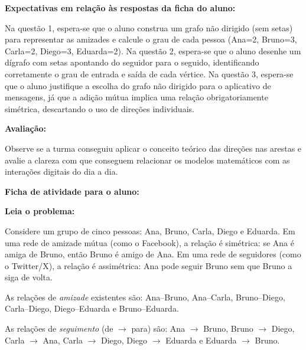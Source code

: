 \documentclass[
  12pt,
  oneside,
  a4paper,
  english,
  brazilian
  ]{abntex2}
\theoremstyle{definition}
\def\bfseries{}%
\begin{document}
\begin{apendicesenv}
\textbf{Expectativas em relação às respostas da ficha do aluno:}

Na questão 1, espera-se que o aluno construa um grafo não dirigido (sem setas) para representar as amizades e calcule o grau de cada pessoa (Ana=2, Bruno=3, Carla=2, Diego=3, Eduarda=2). Na questão 2, espera-se que o aluno desenhe um dígrafo com setas apontando do seguidor para o seguido, identificando corretamente o grau de entrada e saída de cada vértice. Na questão 3, espera-se que o aluno justifique a escolha do grafo não dirigido para o aplicativo de mensagens, já que a adição mútua implica uma relação obrigatoriamente simétrica, descartando o uso de direções individuais.

\textbf{Avaliação:}

Observe se a turma conseguiu aplicar o conceito teórico das direções nas arestas e avalie a clareza com que conseguem relacionar os modelos matemáticos com as interações digitais do dia a dia.

\newpage
\begin{center}
\textbf{Ficha de atividade para o aluno:}
\end{center}

\textbf{Leia o problema:}

Considere um grupo de cinco pessoas: Ana, Bruno, Carla, Diego e Eduarda. Em uma rede de amizade mútua (como o Facebook), a relação é simétrica: se Ana é amiga de Bruno, então Bruno é amigo de Ana. Em uma rede de seguidores (como o Twitter/X), a relação é assimétrica: Ana pode seguir Bruno sem que Bruno a siga de volta.

As relações de \emph{amizade} existentes são:
Ana--Bruno, Ana--Carla, Bruno--Diego, Carla--Diego, Diego--Eduarda e Bruno--Eduarda.

As relações de \emph{seguimento} (de $\to$ para) são:
Ana $\to$ Bruno, Bruno $\to$ Diego, Carla $\to$ Ana, Carla $\to$ Diego, Diego $\to$ Eduarda e Eduarda $\to$ Bruno.

\begin{figure}[htbp]
    \centering
\end{figure}
\end{apendicesenv}
\end{document}
